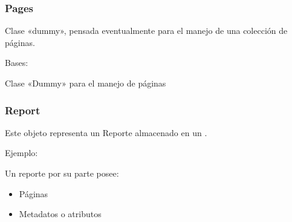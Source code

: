 \documentclass[a4paper,12pt,spanish]{sphinxmanual}
\begin{document}
\label{\detokenize{openerm.Pages:pages}}\label{\detokenize{openerm.Pages:module-openerm.Pages}}\label{\detokenize{openerm.Pages:pages}}

\subsubsection{Pages}
\label{\detokenize{openerm.Pages:id1}}\label{\detokenize{openerm.Pages::doc}}
Clase «dummy», pensada eventualmente para el manejo de una colección de páginas.

\begin{fulllineitems}
\label{\detokenize{openerm.Pages:openerm.Pages.Pages}}
Bases: 

Clase «Dummy» para el manejo de páginas

\end{fulllineitems}

\label{\detokenize{openerm.Report:report}}\label{\detokenize{openerm.Report:module-openerm.Report}}\label{\detokenize{openerm.Report:report}}

\subsubsection{Report}
\label{\detokenize{openerm.Report:id1}}\label{\detokenize{openerm.Report::doc}}
Este objeto representa un Reporte almacenado en un {\hyperref[\detokenize{openerm.Database:module-openerm.Database}]{}}.

Ejemplo:

Un reporte por su parte posee:
\begin{itemize}
\item {} 
Páginas

\item {} 
Metadatos o atributos

\end{itemize}


\end{document}
